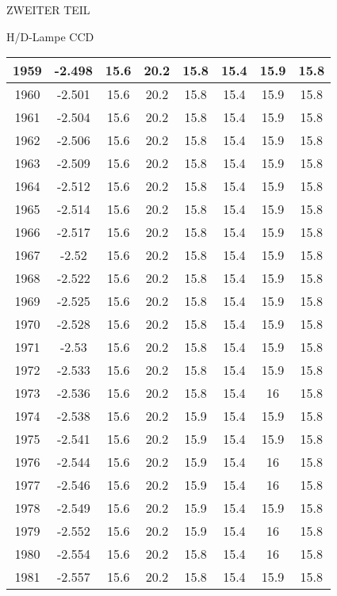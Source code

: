 \begin{appendix}
\begin{chapter}{ZWEITER TEIL}
\begin{section}{H/D-Lampe CCD}
\begin{scriptsize}
\begin{longtable}[htbp]{|c|c|c|c|c|c|c|c|}
            1959 & -2.498 & 15.6 & 20.2 & 15.8 & 15.4 & 15.9 & 15.8 \\ \hline
            1960 & -2.501 & 15.6 & 20.2 & 15.8 & 15.4 & 15.9 & 15.8 \\ \hline
            1961 & -2.504 & 15.6 & 20.2 & 15.8 & 15.4 & 15.9 & 15.8 \\ \hline
            1962 & -2.506 & 15.6 & 20.2 & 15.8 & 15.4 & 15.9 & 15.8 \\ \hline
            1963 & -2.509 & 15.6 & 20.2 & 15.8 & 15.4 & 15.9 & 15.8 \\ \hline
            1964 & -2.512 & 15.6 & 20.2 & 15.8 & 15.4 & 15.9 & 15.8 \\ \hline
            1965 & -2.514 & 15.6 & 20.2 & 15.8 & 15.4 & 15.9 & 15.8 \\ \hline
            1966 & -2.517 & 15.6 & 20.2 & 15.8 & 15.4 & 15.9 & 15.8 \\ \hline
            1967 & -2.52 & 15.6 & 20.2 & 15.8 & 15.4 & 15.9 & 15.8 \\ \hline
            1968 & -2.522 & 15.6 & 20.2 & 15.8 & 15.4 & 15.9 & 15.8 \\ \hline
            1969 & -2.525 & 15.6 & 20.2 & 15.8 & 15.4 & 15.9 & 15.8 \\ \hline
            1970 & -2.528 & 15.6 & 20.2 & 15.8 & 15.4 & 15.9 & 15.8 \\ \hline
            1971 & -2.53 & 15.6 & 20.2 & 15.8 & 15.4 & 15.9 & 15.8 \\ \hline
            1972 & -2.533 & 15.6 & 20.2 & 15.8 & 15.4 & 15.9 & 15.8 \\ \hline
            1973 & -2.536 & 15.6 & 20.2 & 15.8 & 15.4 & 16 & 15.8 \\ \hline
            1974 & -2.538 & 15.6 & 20.2 & 15.9 & 15.4 & 15.9 & 15.8 \\ \hline
            1975 & -2.541 & 15.6 & 20.2 & 15.9 & 15.4 & 15.9 & 15.8 \\ \hline
            1976 & -2.544 & 15.6 & 20.2 & 15.9 & 15.4 & 16 & 15.8 \\ \hline
            1977 & -2.546 & 15.6 & 20.2 & 15.9 & 15.4 & 16 & 15.8 \\ \hline
            1978 & -2.549 & 15.6 & 20.2 & 15.9 & 15.4 & 15.9 & 15.8 \\ \hline
            1979 & -2.552 & 15.6 & 20.2 & 15.9 & 15.4 & 16 & 15.8 \\ \hline
            1980 & -2.554 & 15.6 & 20.2 & 15.8 & 15.4 & 16 & 15.8 \\ \hline
            1981 & -2.557 & 15.6 & 20.2 & 15.8 & 15.4 & 15.9 & 15.8 \\ \hline

\end{longtable}
\end{scriptsize}
\end{section}
\end{chapter}
\end{appendix}
